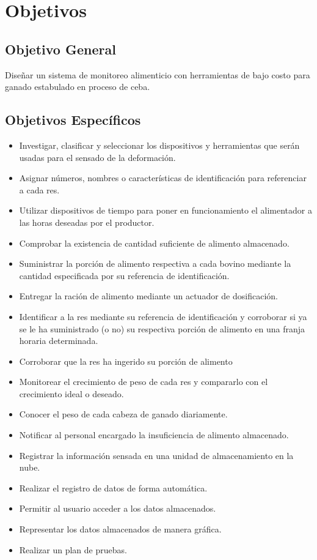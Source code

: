 \section{Objetivos}
\subsection{Objetivo General}


Diseñar un sistema de monitoreo alimenticio con herramientas de bajo costo para ganado estabulado en proceso de ceba.


\subsection{Objetivos Espec\'ificos}

\begin{itemize}
	\item Investigar, clasificar y seleccionar los dispositivos y herramientas que serán usadas para el sensado de la deformación.
	\item Asignar números, nombres  o características de identificación para referenciar a cada res.
	\item Utilizar dispositivos de tiempo para poner en funcionamiento el alimentador a las horas deseadas por el productor.
	\item Comprobar la existencia de cantidad suficiente de alimento almacenado.
	\item Suministrar la porción de alimento respectiva a cada bovino mediante la cantidad especificada por su referencia de identificación.
	\item Entregar la ración de alimento mediante un actuador de dosificación.
	\item Identificar a la res mediante su referencia de identificación y corroborar si ya se le ha suministrado (o no) su respectiva porción de alimento en una franja horaria determinada.
	\item Corroborar que la res ha ingerido su porción de alimento
	\item Monitorear el crecimiento de peso de cada res y compararlo con el crecimiento ideal o deseado.
	\item Conocer el peso de cada cabeza de ganado diariamente.
	\item Notificar al personal encargado la insuficiencia de alimento almacenado.
	\item Registrar la información sensada en una unidad de almacenamiento en la nube.
	\item Realizar el registro de datos de forma automática.
	\item Permitir al usuario acceder a los datos almacenados.
	\item Representar los datos almacenados de manera gráfica.
	\item Realizar un plan de pruebas.
\end{itemize}


